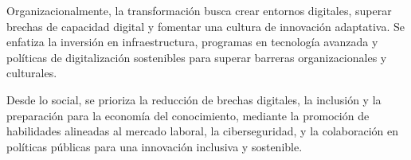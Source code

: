 Organizacionalmente, la transformación busca crear entornos digitales,
superar brechas de capacidad digital y fomentar una cultura de
innovación adaptativa. Se enfatiza la inversión en infraestructura,
programas en tecnología avanzada y políticas de digitalización
sostenibles para superar barreras organizacionales y culturales.

Desde lo social, se prioriza la reducción de brechas digitales, la
inclusión y la preparación para la economía del conocimiento, mediante
la promoción de habilidades alineadas al mercado laboral, la
ciberseguridad, y la colaboración en políticas públicas para una
innovación inclusiva y sostenible.
